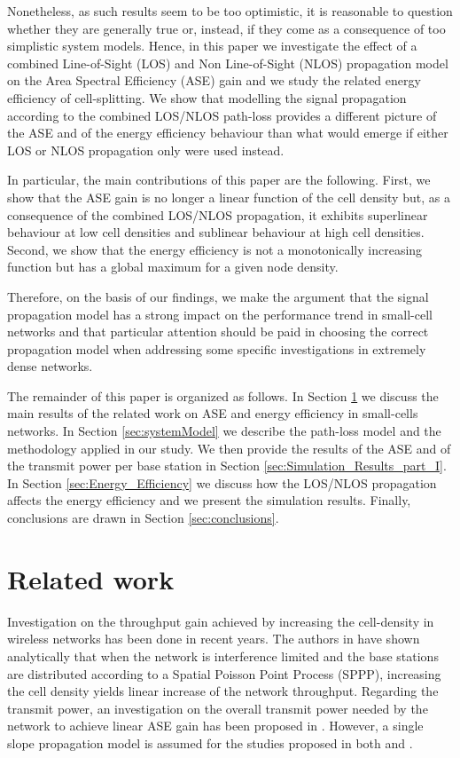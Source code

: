 \documentclass[twocoumn]{IEEEtran}
\begin{document}
Nonetheless, as such results seem to be too optimistic, it is reasonable to question whether they are generally true or, instead, if they come as a  consequence of too simplistic system models.
Hence, in this paper we investigate the effect of a combined Line-of-Sight (LOS) and Non Line-of-Sight (NLOS) propagation model on the Area Spectral Efficiency (ASE) gain and we study the related energy efficiency of cell-splitting. We show that modelling the signal propagation according to the combined LOS/NLOS
path-loss provides a different picture of the ASE and of the
energy efficiency behaviour than what would emerge if either LOS or NLOS propagation only were used instead. 

In particular, the main contributions of this paper are the following. First, we show that the ASE gain is no longer a linear function of the cell density but, as a consequence of the combined LOS/NLOS propagation, it exhibits superlinear behaviour at low cell densities and sublinear behaviour at high cell densities. Second, we show that the energy efficiency is not a monotonically increasing function but has a global maximum for a given node density. 

Therefore, on the basis of our findings, we make the argument that the signal propagation model has a strong impact on the performance trend in small-cell networks and that particular attention should be paid in choosing the correct
propagation model when addressing some specific investigations in extremely dense networks.

The remainder of this paper is organized as follows. In Section \ref{sect:RelatedWork}
we discuss the main results of the related work on ASE and energy efficiency
in small-cells networks. In Section \ref{sec:systemModel} we describe the path-loss model and the methodology applied in our study. We then provide the results of the ASE and of the transmit power per base station in Section \ref{sec:Simulation_Results_part_I}. In Section \ref{sec:Energy_Efficiency}
 we discuss how the LOS/NLOS propagation affects the energy efficiency and we present the simulation results. Finally, conclusions
are drawn in Section \ref{sec:conclusions}.

\section{Related work}
\label{sect:RelatedWork}

Investigation on the throughput gain achieved by increasing the cell-density in wireless networks has been done in recent years. The authors in \cite{Andrews2011} have shown analytically that when the network is interference limited and the base stations are distributed according to a Spatial Poisson Point Process (SPPP), increasing the cell density yields linear increase of the network throughput. Regarding the transmit power, an investigation on the overall transmit power needed by the network to achieve linear ASE gain has been proposed in \cite{Galiotto2013}.  
However, a single slope propagation model is assumed for the studies proposed in both \cite{Andrews2011} and \cite{Galiotto2013}. 
\end{document}
